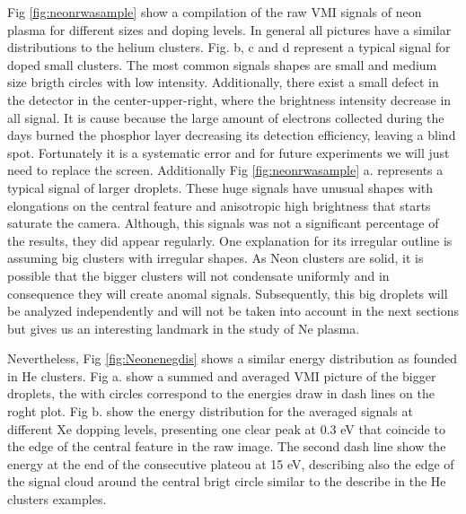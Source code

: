 Fig \ref{fig:neonrwasample} show a compilation of the raw VMI signals of neon plasma for different sizes and doping levels. In general all pictures have a similar distributions to the helium clusters. Fig. b, c and d represent a typical signal for doped small clusters. The most common signals shapes are  small and medium size brigth circles with low intensity. Additionally, there exist a small defect in the detector in the center-upper-right, where the brightness intensity decrease in all signal. It is cause because the large amount of electrons collected during the days burned the phosphor layer decreasing its detection efficiency, leaving a blind spot. Fortunately it is a systematic error and for future experiments we will just need to replace the screen. Additionally Fig  \ref{fig:neonrwasample} a. represents a typical signal of larger droplets. These huge signals have  unusual shapes with elongations on the central feature and anisotropic high brightness that starts saturate the camera. Although, this signals was not a significant percentage of the results, they did appear regularly. One explanation for its irregular outline is assuming big clusters with irregular shapes. As Neon clusters are solid, it is possible that the bigger clusters will not condensate uniformly and in consequence they will create anomal signals. Subsequently, this big droplets will be analyzed independently and will not be taken into account in the next sections but gives us an interesting landmark in the study of Ne plasma.

Nevertheless, Fig \ref{fig:Neonenegdis} shows a similar energy distribution as founded in He clusters.  Fig a. show a  summed and averaged VMI picture of the bigger droplets, the with circles correspond to the energies draw in dash lines on the roght plot. Fig b. show the energy distribution for the averaged  signals at different Xe dopping levels, presenting one clear peak at 0.3 eV that coincide to the edge of the central feature in the raw image. The second dash line show the energy at the end of the consecutive plateou at 15 eV, describing also the edge of the signal cloud around the central brigt circle similar to the describe in the He clusters examples.

